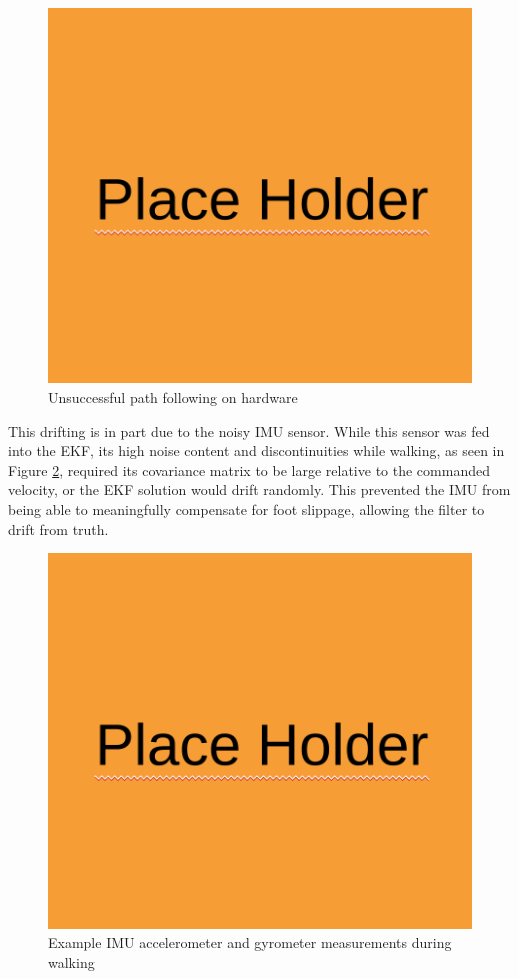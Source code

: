 \begin{figure}[H]
    \centerline{\includegraphics[scale=0.25]{place_holder.png}}
    \caption{Unsuccessful path following on hardware}
    \label{fig:hardware_path_following}
\end{figure}

This drifting is in part due to the noisy IMU sensor. While this sensor was fed into the EKF, its high noise content and discontinuities while walking, as seen in Figure \ref{fig:imu_data}, required its covariance matrix to be large relative to the commanded velocity, or the EKF solution would drift randomly. This prevented the IMU from being able to meaningfully compensate for foot slippage, allowing the filter to drift from truth. 

\begin{figure}[H]
    \centerline{\includegraphics[scale=0.25]{place_holder.png}}
    \caption{Example IMU accelerometer and gyrometer measurements during walking}
    \label{fig:imu_data}
\end{figure}

